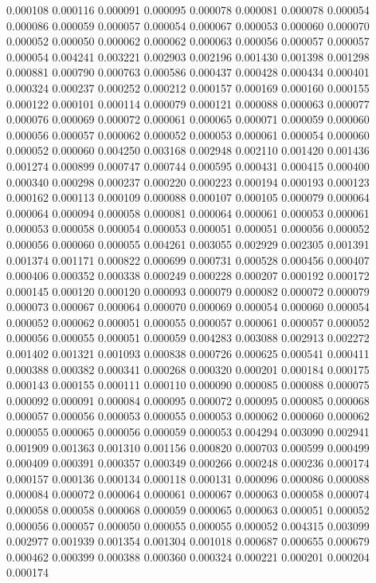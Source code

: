 0.000108
0.000116
0.000091
0.000095
0.000078
0.000081
0.000078
0.000054
0.000086
0.000059
0.000057
0.000054
0.000067
0.000053
0.000060
0.000070
0.000052
0.000050
0.000062
0.000062
0.000063
0.000056
0.000057
0.000057
0.000054
0.004241
0.003221
0.002903
0.002196
0.001430
0.001398
0.001298
0.000881
0.000790
0.000763
0.000586
0.000437
0.000428
0.000434
0.000401
0.000324
0.000237
0.000252
0.000212
0.000157
0.000169
0.000160
0.000155
0.000122
0.000101
0.000114
0.000079
0.000121
0.000088
0.000063
0.000077
0.000076
0.000069
0.000072
0.000061
0.000065
0.000071
0.000059
0.000060
0.000056
0.000057
0.000062
0.000052
0.000053
0.000061
0.000054
0.000060
0.000052
0.000060
0.004250
0.003168
0.002948
0.002110
0.001420
0.001436
0.001274
0.000899
0.000747
0.000744
0.000595
0.000431
0.000415
0.000400
0.000340
0.000298
0.000237
0.000220
0.000223
0.000194
0.000193
0.000123
0.000162
0.000113
0.000109
0.000088
0.000107
0.000105
0.000079
0.000064
0.000064
0.000094
0.000058
0.000081
0.000064
0.000061
0.000053
0.000061
0.000053
0.000058
0.000054
0.000053
0.000051
0.000051
0.000056
0.000052
0.000056
0.000060
0.000055
0.004261
0.003055
0.002929
0.002305
0.001391
0.001374
0.001171
0.000822
0.000699
0.000731
0.000528
0.000456
0.000407
0.000406
0.000352
0.000338
0.000249
0.000228
0.000207
0.000192
0.000172
0.000145
0.000120
0.000120
0.000093
0.000079
0.000082
0.000072
0.000079
0.000073
0.000067
0.000064
0.000070
0.000069
0.000054
0.000060
0.000054
0.000052
0.000062
0.000051
0.000055
0.000057
0.000061
0.000057
0.000052
0.000056
0.000055
0.000051
0.000059
0.004283
0.003088
0.002913
0.002272
0.001402
0.001321
0.001093
0.000838
0.000726
0.000625
0.000541
0.000411
0.000388
0.000382
0.000341
0.000268
0.000320
0.000201
0.000184
0.000175
0.000143
0.000155
0.000111
0.000110
0.000090
0.000085
0.000088
0.000075
0.000092
0.000091
0.000084
0.000095
0.000072
0.000095
0.000085
0.000068
0.000057
0.000056
0.000053
0.000055
0.000053
0.000062
0.000060
0.000062
0.000055
0.000065
0.000056
0.000059
0.000053
0.004294
0.003090
0.002941
0.001909
0.001363
0.001310
0.001156
0.000820
0.000703
0.000599
0.000499
0.000409
0.000391
0.000357
0.000349
0.000266
0.000248
0.000236
0.000174
0.000157
0.000136
0.000134
0.000118
0.000131
0.000096
0.000086
0.000088
0.000084
0.000072
0.000064
0.000061
0.000067
0.000063
0.000058
0.000074
0.000058
0.000058
0.000068
0.000059
0.000065
0.000063
0.000051
0.000052
0.000056
0.000057
0.000050
0.000055
0.000055
0.000052
0.004315
0.003099
0.002977
0.001939
0.001354
0.001304
0.001018
0.000687
0.000655
0.000679
0.000462
0.000399
0.000388
0.000360
0.000324
0.000221
0.000201
0.000204
0.000174
